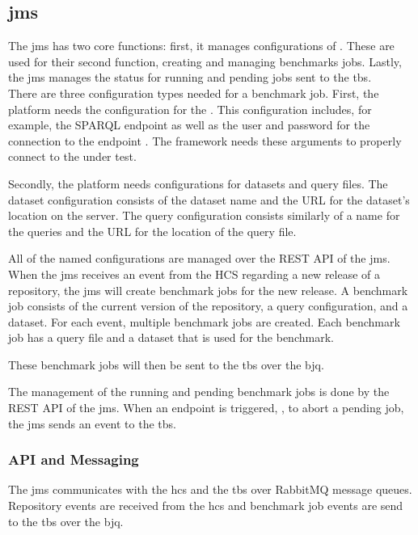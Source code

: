 \subsection{\acl{jms}}
\label{sec:jobs_managing_service}
The \acf{jms} has two core functions: first, it manages configurations of \tsp{}.
These are used for their second function, creating and managing benchmarks jobs.
Lastly, the \ac{jms} manages the status for running and pending jobs sent to the \ac{tbs}.
\\

There are three configuration types needed for a benchmark job.
First, the platform needs the configuration for the \ts{}.
This configuration includes, for example, the SPARQL endpoint as well as the user and password for the connection to the endpoint \cite{IguanaDocsConfigurationa}.
The \iguana{} framework needs these arguments to properly connect to the \ts{} under test.

Secondly, the platform needs configurations for datasets and query files.
The dataset configuration consists of the dataset name and the URL for the dataset's location on the server.
The query configuration consists similarly of a name for the queries and the URL for the location of the query file.

All of the named configurations are managed over the REST API of the \ac{jms}.
\\

When the \ac{jms} receives an event from the HCS regarding a new release of a repository, the \ac{jms} will create benchmark jobs for the new release.
A benchmark job consists of the current version of the repository, a query configuration, and a dataset.
For each event, multiple benchmark jobs are created.
Each benchmark job has a query file and a dataset that is used for the benchmark.

These benchmark jobs will then be sent to the \ac{tbs} over the \acl{bjq}.

The management of the running and pending benchmark jobs is done by the REST API of the \ac{jms}.
When an endpoint is triggered, \eg, to abort a pending job, the \ac{jms} sends an event to the \ac{tbs}.


\subsubsection{API and Messaging}
\label{sec:jobs_api}
The \ac{jms} communicates with the \ac{hcs} and the \ac{tbs} over RabbitMQ message queues.
Repository events are received from the \ac{hcs} and benchmark job events are send to the \ac{tbs} over the \ac{bjq}.
\\

